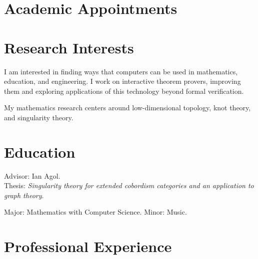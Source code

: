 \documentclass[11pt,letterpaper,roman]{moderncv}
\begin{document}
\maketitle
\vspace{-2em}

\section{Academic Appointments}



\section{Research Interests}

I am interested in finding ways that computers can be used in mathematics, education, and engineering.
I work on interactive theorem provers, improving them and exploring applications of this technology beyond formal verification.

\vspace{0.5em}
My mathematics research centers around low-dimensional topology, knot theory, and singularity theory.


\section{Education}

{Advisor: Ian Agol.\\
Thesis: \emph{Singularity theory for extended cobordism categories and an application to graph theory}.}

{Major: Mathematics with Computer Science. Minor: Music.}

\section{Professional Experience}

\end{document}
